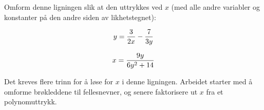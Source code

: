 

Omform denne ligningen slik at den uttrykkes ved $x$ (med alle andre variabler og konstanter på den andre siden av likhetstegnet):

$$y = {3 \over 2x} - {7 \over 3y}$$







$$x = {9y \over {6y^2 + 14}}$$







Det kreves flere trinn for å løse for $x$ i denne ligningen. Arbeidet starter med å omforme brøkleddene til fellesnevner, og senere faktorisere ut $x$ fra et polynomuttrykk.



